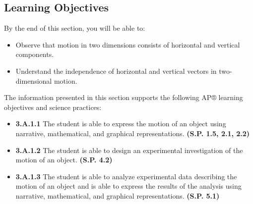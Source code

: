 \documentclass[
]{book}
\providecommand{\tightlist}{%
  \setlength{\itemsep}{0pt}\setlength{\parskip}{0pt}}
\newenvironment{learning-objectives}{}{}
\begin{document}
\hypertarget{fs-id1263980}{}
\begin{learning-objectives}

\hypertarget{learning-objectives-8}{%
\subsection{Learning Objectives}\label{learning-objectives-8}}

By the end of this section, you will be able to:

\begin{itemize}
\tightlist
\item
  Observe that motion in two dimensions consists of horizontal and
  vertical components.
\item
  Understand the independence of horizontal and vertical vectors in
  two-dimensional motion.
\end{itemize}

The information presented in this section supports the following AP®
learning objectives and science practices:

\begin{itemize}
\tightlist
\item
  \textbf{3.A.1.1} The student is able to express the motion of an object
  using narrative, mathematical, and graphical representations.
  \textbf{(S.P. 1.5, 2.1, 2.2)}
\item
  \textbf{3.A.1.2} The student is able to design an experimental
  investigation of the motion of an object. \textbf{(S.P. 4.2)}
\item
  \textbf{3.A.1.3} The student is able to analyze experimental data
  describing the motion of an object and is able to express the
  results of the analysis using narrative, mathematical, and graphical
  representations. \textbf{(S.P. 5.1)}
\end{itemize}

\end{learning-objectives}
\end{document}
